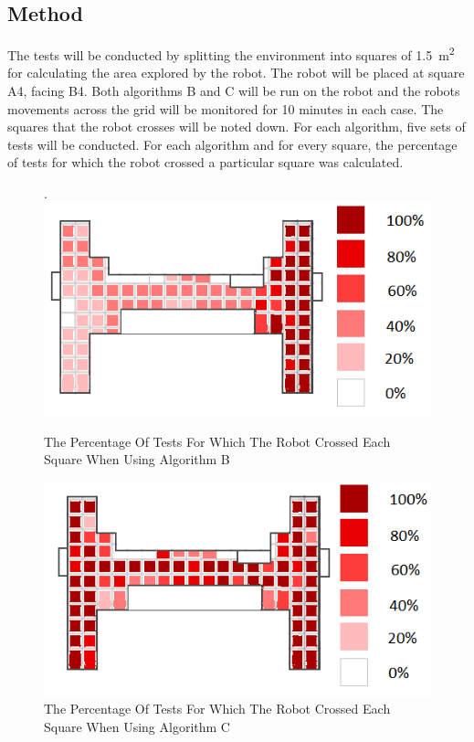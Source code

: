 \documentclass[letterpaper, 10 pt, conference]{ieeeconf}  %
\begin{document}
\subsection{Method} 
The tests will be conducted by splitting the environment into squares of \SI{1.5}{m^2} for calculating the area explored by the robot.  The robot will be placed at square A4, facing B4. Both algorithms B and C will be run on the robot and the robots movements across the grid will be monitored for 10 minutes in each case. The squares that the robot crosses will be noted down. For each algorithm, five sets of tests will be conducted.
For each algorithm and for every square, the percentage of tests for which the robot crossed a particular square was calculated.

\begin{figure}[t]. 
\centering
\captionsetup{justification=centering}
\includegraphics[scale=0.4]{maplgfloor3_superbasic}
\caption{The Percentage Of Tests For Which The Robot Crossed Each Square When Using Algorithm B}
\label{fig:superbasicfloor}
\end{figure}

\begin{figure}[t]
\centering
\captionsetup{justification=centering}
\includegraphics[scale=0.4]{maplgfloor3_superbasicopenspace}
\caption{The Percentage Of Tests For Which The Robot Crossed Each Square When Using Algorithm C}
\label{fig:superbasicopenspacefloor}
\end{figure}
\end{document}
